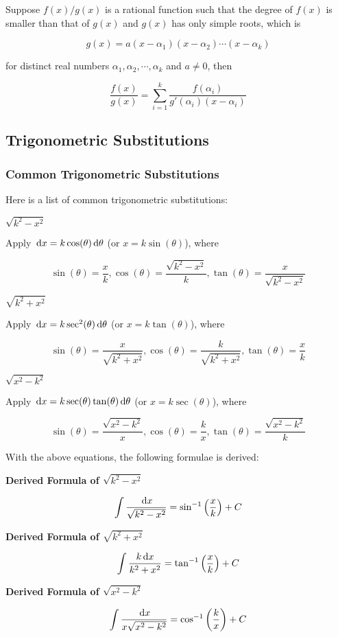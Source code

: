 \documentclass[a4paper,12pt]{article}
\begin{document}
\begin{thm}
  Suppose $f(x)/g(x)$ is a rational function such that the degree of $f(x)$ is smaller than that of $g(x)$ and $g(x)$ has only simple roots, which is

  $$g(x)=a(x-\alpha_{1})(x-\alpha_{2})\cdots(x-\alpha_{k})$$\s

  for distinct real numbers $\alpha_{1},\alpha_{2},\cdots,\alpha_{k}$ and $a\neq 0$, then

  $$\frac{f(x)}{g(x)}=\sum_{i=1}^{k}\frac{f(\alpha_{i})}{g'(\alpha_{i})(x-\alpha_{i})}$$
\end{thm}

\subsection{Trigonometric Substitutions}
\subsubsection{Common Trigonometric Substitutions}
Here is a list of common trigonometric substitutions:

\begin{alist}
  \item $\sqrt{k^{2}-x^{2}}$\n

  Apply $\,\mathrm{d} x=k\cos(\theta)\,\mathrm{d}\theta$ (or $x=k\sin(\theta)$), where

  $$\sin(\theta)=\frac{x}{k},\cos(\theta)=\frac{\sqrt{k^{2}-x^{2}}}{k},\tan(\theta)=\frac{x}{\sqrt{k^{2}-x^{2}}}$$

  \item $\sqrt{k^{2}+x^{2}}$\n

  Apply $\,\mathrm{d} x=k\sec^{2}(\theta)\,\mathrm{d}\theta$ (or $x=k\tan(\theta)$), where

  $$\sin(\theta)=\frac{x}{\sqrt{k^{2}+x^{2}}},\cos(\theta)=\frac{k}{\sqrt{k^{2}+x^{2}}},\tan(\theta)=\frac{x}{k}$$

  \item $\sqrt{x^{2}-k^{2}}$\n

  Apply $\,\mathrm{d} x=k\sec(\theta)\tan(\theta)\,\mathrm{d}\theta$ (or $x=k\sec(\theta)$), where

  $$\sin(\theta)=\frac{\sqrt{x^{2}-k^{2}}}{x},\cos(\theta)=\frac{k}{x},\tan(\theta)=\frac{\sqrt{x^{2}-k^{2}}}{k}$$
\end{alist}

With the above equations, the following formulae is derived:

\begin{alist}
  \item \textbf{Derived Formula of $\sqrt{k^{2}-x^{2}}$}

  $$\int\frac{\,\mathrm{d} x}{\sqrt{k^{2}-x^{2}}}=\sin^{-1}\left( \frac{x}{k}\right)+C$$

  \item \textbf{Derived Formula of $\sqrt{k^{2}+x^{2}}$}

  $$\int\frac{k\,\mathrm{d} x}{k^{2}+x^{2}}=\tan^{-1}\left( \frac{x}{k}\right)+C$$

  \item \textbf{Derived Formula of $\sqrt{x^{2}-k^{2}}$}

  $$\int\frac{\,\mathrm{d} x}{x\sqrt{x^{2}-k^{2}}}=\cos^{-1}\left( \frac{k}{x}\right)+C$$
\end{alist}
\end{document}
